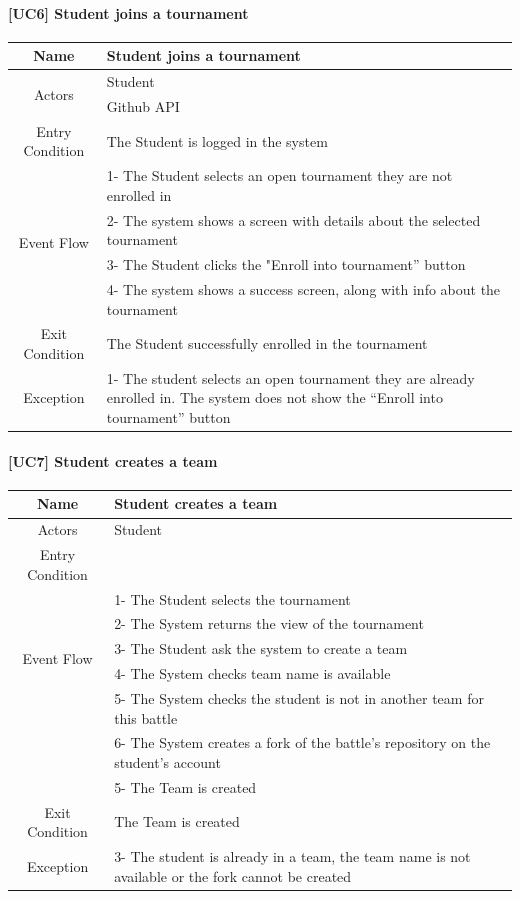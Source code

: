 \documentclass{article}
\begin{document}
\paragraph{[UC6] Student joins a tournament}
\begin{center}
\begin{tabular}{|c|m{40em}|}
\hline
Name & Student joins a tournament\\
\hline
\multirow{2}{4em}{Actors}
& Student\\
& Github API\\
\hline
Entry Condition & The Student is logged in the system\\
\hline
\multirow{4}{4em}{Event Flow}
&1- The Student selects an open tournament they are not enrolled in\\
&2- The system shows a screen with details about the selected tournament\\
&3- The Student clicks the "Enroll into tournament” button\\
&4- The system shows a success screen, along with info about the tournament\\
\hline
Exit Condition & The Student successfully enrolled in the tournament\\
\hline
Exception & 1- The student selects an open tournament they are already enrolled in. The system does not show the “Enroll into tournament” button\\
\hline
\end{tabular}
\end{center}

\newpage
\paragraph{[UC7] Student creates a team}
\begin{center}
\begin{tabular}{|c|m{40em}|}
\hline
Name & Student creates a team\\
\hline
\multirow{1}{4em}{Actors}
& Student\\
\hline
Entry Condition & 	\\
\hline
\multirow{5}{4em}{Event Flow}
& 1- The Student selects the tournament\\
& 2- The System returns the view of the tournament\\
& 3- The Student ask the system to create a team\\
& 4- The System checks team name is available\\
& 5- The System checks the student is not in another team for this battle\\
& 6- The System creates a fork of the battle's repository on the student's account\\
& 5- The Team is created\\
\hline
Exit Condition & The Team is created\\
\hline
Exception & 3- The student is already in a team, the team name is not available or the fork cannot be created\\
\hline
\end{tabular}
\end{center}
\end{document}
